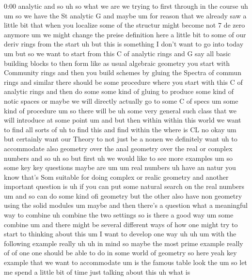 \begin{unfinished}{0:00}
analytic
and
so
uh
so  what  we  are  we  trying  to  first
through  in  the
course
uh  um  so  we  have  the  St  analytic  G  and
maybe  um  for  reason  that  we  already  saw
a  little  bit  that  when  you
localize  some  of  the  structur  might
become  not  7  de  zero  anymore  um  we  might
change  the  preise  definition  here  a
little  bit  to  some  of  our  deriv  rings
from  the  start  uh  but  this  is  something
I  don't  want  to  go  into  today
um  but  so  we  want  to  start  from  this  C
of  analytic  rings  and  G  say  all  basic
building  blocks  to  then
form  like  as  usual  algebraic  geometry
you  start  with  Community  rings  and  then
you  build  schemes  by  gluing  the  Spectra
of  commun  rings  and  similar  there  should
be  some  procedure  where  you  start  with
this  C  of  analytic  rings  and  then  do
some  some  kind  of  gluing  to  produce  some
kind  of  notic  spaces  or  maybe  we  will
directly  actually  go  to  some  C  of
specs
um  some  kind  of
procedure
um
so  there  will  be
uh  some  very  general  such  class  that  we
will  introduce  at  some  point
um  and  but  then  within  within  this  world
we  want  to  find  all  sorts  of  uh  to
find  this  and  find  within
the
where  is
CL
no
okay  um  but  certainly  want  our  Theory  to
not  just  be  a  nonen  we  definitely  want
uh  to  accommodate  also  geometry  over  the
anal  geometry  over  the  real  or  complex
numbers  and
so  uh  so  but
first  uh  we  would  like  to  see  more
examples
um
so  some  key  key  questions  maybe
are
um
um  real
numbers  uh  have  an
natur  you  know  that's  Som  suitable  for
doing  complex  or  realic
geometry  and  another  important  question
is  uh  if  you  can  put  some  natural  search
on  the  real  numbers
um  and  so  can  do  some  kind  ofi  geometry
but  the  other  also  have  non  geometry
using  the  solid  modules  um  maybe  and
then  there's  a  question  what  a
meaningful  way  to  combine  uh  combine  the
two  settings  so  is  there  a  good
way  um  some  combine
um  and  there  might  be  several  different
ways  of  how  one  might  try  to  start  to
thinking  about  this  um  I  want  to  develop
one  way  uh
uh  um  with  the  following  example  really
uh  uh  in
mind  so  maybe  the  most  prime  example
really  of  of  one  one  should  be  able  to
do  in  some  world  of  geometry  so  here
yeah  key  example  that  we  want  to
accommodate  um  is  the  famous  table  look
the  um  so  let  me  spend  a  little  bit  of
time  just  talking  about  this
uh  what  is

\end{unfinished}

